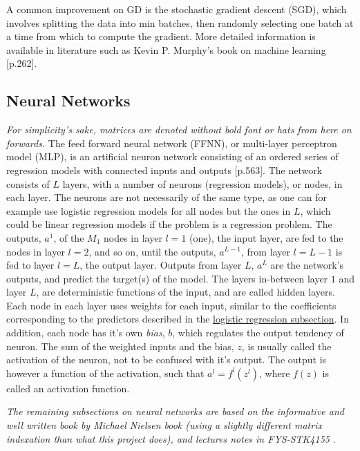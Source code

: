 \documentclass[%
oneside,                 %
final,                   %
10pt]{article}
\begin{document}
A common improvement on GD is the stochastic gradient descent (SGD), which involves splitting the data into min batches, then randomly selecting one batch at a time from which to compute the gradient. More detailed information is available in literature such as Kevin P. Murphy's book on machine learning \citep{MLMurphy}[p.262].

\subsection{Neural Networks} \label{Section_M_NN}
\textit{For simplicity's sake, matrices are denoted without bold font or hats from here on forwards.} The feed forward neural network (FFNN), or multi-layer perceptron model (MLP), is an artificial neuron network consisting of an ordered series of regression models with connected inputs and outputs \citep{MLMurphy}[p.563]. The network consists of $L$ layers, with  a number of neurons (regression models), or nodes, in each layer. The neurons are not necessarily of the same type, as one can for example use logistic regression models for all nodes but the ones in $L$, which could be linear regression models if the problem is a regression problem. The outputs, $a^1$, of the $M_1$ nodes in layer $l=1$ (one), the input layer, are fed to the nodes in layer $l=2$, and so on, until the outputs, $a^{L-1}$, from layer $l=L-1$ is fed to layer $l=L$, the output layer. Outputs from layer $L$, $a^L$ are the network's outputs, and predict the target(s) of the model. The layers in-between layer $1$ and layer $L$, are deterministic functions of the input, and are called hidden layers.  Each node in each layer uses weights for each input, similar to the coefficients  corresponding to the predictors described in the \hyperref[Section_M_Logreg]{logistic regression subsection}. In addition, each node has it's own \textit{bias}, $b$, which regulates the output tendency of neuron. The sum of the weighted inputs and the bias, $z$, is usually called the activation of the neuron, not to be confused with it's output. The output is however a function of the activation, such that $a^l=f^l(z^l)$, where $f(z)$ is called an activation function. \newline

\textit{The remaining subsections on neural networks are based on the informative and well written book by Michael Nielsen book \citep{Nielsen15} (using a slightly different matrix indexation than what this project does), and lectures notes in   FYS-STK4155 \cite{MHJ_NN}}.
\end{document}
